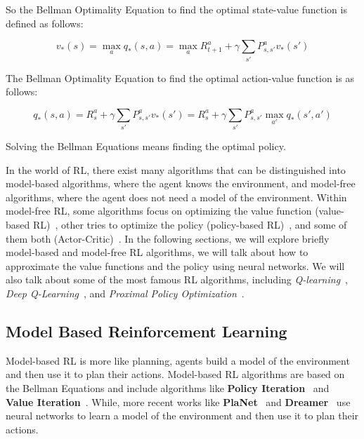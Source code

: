 So the Bellman Optimality Equation to find the optimal state-value function is defined as follows:

\begin{equation} \label{eq:optimal_state_value}
    v_*(s) = \max_{a} q_*(s, a) = \max_{a} R_{t+1}^a + \gamma \sum_{s'} P_{s, s'}^a v_*(s')
\end{equation}

The Bellman Optimality Equation to find the optimal action-value function is as follows:

\begin{equation} \label{eq:optimal_action_value}
    q_*(s, a) = R_s^a + \gamma \sum_{s'} P_{s, s'}^a v_*(s') = R_s^a + \gamma \sum_{s'} P_{s, s'}^a \max_{a'} q_*(s', a')
\end{equation}


Solving the Bellman Equations means finding the optimal policy.

In the world of RL, there exist many algorithms that can be distinguished into model-based algorithms, where the agent knows the environment, and model-free algorithms, where the agent does not need a model of the environment.
Within model-free RL, some algorithms focus on optimizing the value function (value-based RL)~\citep{sutton1988learning}, other tries to optimize the policy (policy-based RL)~\citep{sutton1999policy}, and some of them both (Actor-Critic)~\citep{konda1999actor}.
In the following sections, we will explore briefly model-based and model-free RL algorithms, we will talk about how to approximate the value functions and the policy using neural networks.
We will also talk about some of the most famous RL algorithms, including \textit{Q-learning}~\citep{watkins1992q}, \textit{Deep Q-Learning}~\citep{mnih2013playing}, and \textit{Proximal Policy Optimization}~\citep{schulman2017proximal}.


\subsection{Model Based Reinforcement Learning}
\label{subsec:model_based_rl}
Model-based RL is more like planning, agents build a model of the environment and then use it to plan their actions.
Model-based RL algorithms are based on the Bellman Equations and include algorithms like \textbf{Policy Iteration}~\citep{howard1960dynamic} and \textbf{Value Iteration}~\citep{bellman1966dynamic}.
While, more recent works like \textbf{PlaNet}~\citep{hafner2019learning} and \textbf{Dreamer}~\citep{hafner2019dream} use neural networks to learn a model of the environment and then use it to plan their actions.


